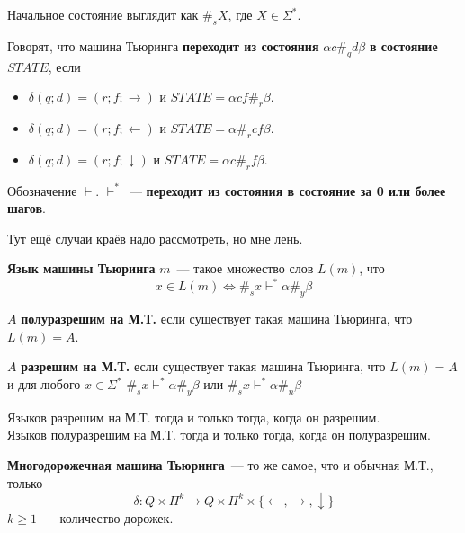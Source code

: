 \documentclass{article}
\begin{document}
    \begin{remark}
        Начальное состояние выглядит как $\#_sX$, где $X\in\Sigma^*$.
    \end{remark}
    \begin{definition}
        Говорят, что машина Тьюринга \textbf{переходит из состояния} $\alpha c\#_qd\beta$ \textbf{в состояние} $STATE$, если
        \begin{itemize}
            \item $\delta(q;d)=(r;f;\rightarrow)$ и $STATE=\alpha cf\#_r\beta$.
            \item $\delta(q;d)=(r;f;\leftarrow)$ и $STATE=\alpha\#_rcf\beta$.
            \item $\delta(q;d)=(r;f;\downarrow)$ и $STATE=\alpha c\#_rf\beta$.
        \end{itemize}
        Обозначение $\vdash$. $\vdash^*$~--- \textbf{переходит из состояния в состояние за 0 или более шагов}.
    \end{definition}
    \begin{remark}
        Тут ещё случаи краёв надо рассмотреть, но мне лень.
    \end{remark}
    \begin{definition}
        \textbf{Язык машины Тьюринга} $m$~--- такое множество слов $L(m)$, что
        $$
        x\in L(m)\Leftrightarrow \#_sx\vdash^*\alpha\#_y\beta
        $$
    \end{definition}
    \begin{definition}
        $A$ \textbf{полуразрешим на М.Т.} если существует такая машина Тьюринга, что $L(m)=A$.
    \end{definition}
    \begin{definition}
        $A$ \textbf{разрешим на М.Т.} если существует такая машина Тьюринга, что $L(m)=A$ и для любого $x\in\Sigma^*$ $\#_sx\vdash^*\alpha\#_y\beta$ или $\#_sx\vdash^*\alpha\#_n\beta$
    \end{definition}
    \begin{claim}
        Языков разрешим на М.Т. тогда и только тогда, когда он разрешим.\\
        Языков полуразрешим на М.Т. тогда и только тогда, когда он полуразрешим.
    \end{claim}
    \begin{definition}
        \textbf{Многодорожечная машина Тьюринга}~--- то же самое, что и обычная М.Т., только
        $$
        \delta\colon Q\times\Pi^k\to Q\times\Pi^k\times\{\leftarrow,\rightarrow,\downarrow\}
        $$
        $k\geqslant 1$~--- количество дорожек.
    \end{definition}
\end{document}
